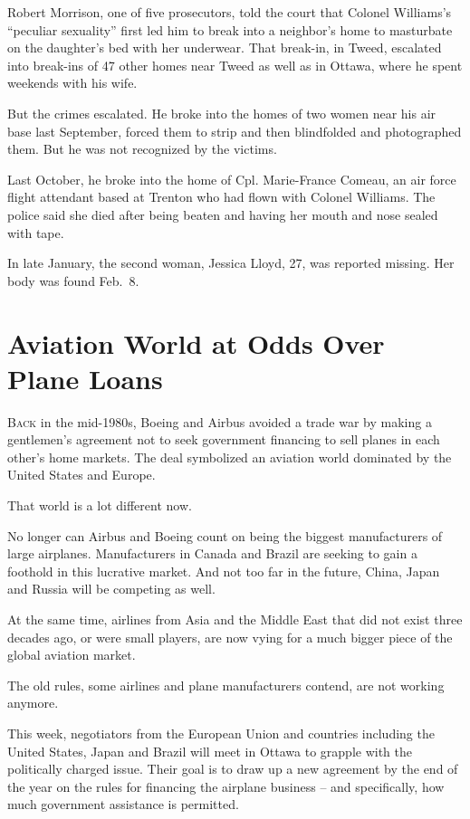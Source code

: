 ﻿\documentclass[12pt]{article}
\begin{document}
Robert Morrison, one of five prosecutors, told the court that Colonel Williams's ``peculiar
sexuality'' first led him to break into a neighbor's home to masturbate on the daughter's bed with
her underwear. That break-in, in Tweed, escalated into break-ins of 47 other homes near Tweed as
well as in Ottawa, where he spent weekends with his wife.

But the crimes escalated. He broke into the homes of two women near his air base last September,
forced them to strip and then blindfolded and photographed them. But he was not recognized by the
victims.

Last October, he broke into the home of Cpl. Marie-France Comeau, an air force flight attendant
based at Trenton who had flown with Colonel Williams. The police said she died after being beaten
and having her mouth and nose sealed with tape.

In late January, the second woman, Jessica Lloyd, 27, was reported missing. Her body was found
Feb.~8.

\section{Aviation World at Odds Over Plane Loans}

\lettrine{B}{ack} in the mid-1980s, Boeing and Airbus avoided a trade war by
making a gentlemen's agreement not to seek government financing to sell planes in each other's home
markets. The deal symbolized an aviation world dominated by the United States and Europe.

That world is a lot different now.

No longer can Airbus and Boeing count on being the biggest manufacturers of large airplanes.
Manufacturers in Canada and Brazil are seeking to gain a foothold in this lucrative market. And not
too far in the future, China, Japan and Russia will be competing as well.

At the same time, airlines from Asia and the Middle East that did not exist three decades ago, or
were small players, are now vying for a much bigger piece of the global aviation market.

The old rules, some airlines and plane manufacturers contend, are not working anymore.

This week, negotiators from the European Union and countries including the United States, Japan and
Brazil will meet in Ottawa to grapple with the politically charged issue. Their goal is to draw up a
new agreement by the end of the year on the rules for financing the airplane business -- and
specifically, how much government assistance is permitted.
\end{document}
